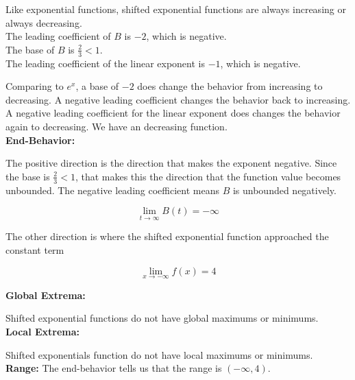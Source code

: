 \documentclass{ximera}
\begin{document}
\begin{example}
Like exponential functions, shifted exponential functions are always increasing or always decreasing. \\



The leading coefficient of $B$ is $-2$, which is negative. \\

The base of $B$ is $\frac{2}{3} < 1$.\\

The leading coefficient of the linear exponent is $-1$, which is negative.  



Comparing to $e^x$, a base of $-2$ does change the behavior from increasing to decreasing. A negative leading coefficient changes the behavior back to increasing.  A negative leading coefficient for the linear exponent does changes the behavior again to decreasing.  We have an decreasing function. \\






\textbf{End-Behavior:} 



The positive direction is the direction that makes the exponent negative.  Since the base is $\frac{2}{3} < 1$, that makes this the direction that the function value becomes unbounded.  The negative leading coefficient means $B$ is unbounded negatively.



\[
\lim\limits_{t \to \infty} B(t) = -\infty
\]


The other direction is where the shifted exponential function approached the constant term



\[
\lim\limits_{x \to -\infty} f(x) = 4
\]










\textbf{Global Extrema:} 

Shifted exponential functions do not have global maximums or minimums. \\


\textbf{Local Extrema:} 

Shifted exponentials function do not have local maximums or minimums. \\



\textbf{Range:} The end-behavior tells us that the range is $(-\infty, 4)$.










\end{example}
\end{document}
